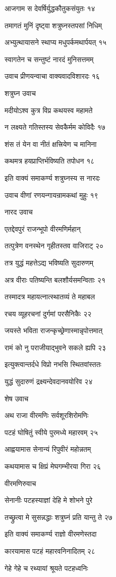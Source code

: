 आजगाम स देवर्षिर्युद्धकौतुकसंयुतः १४

तमागतं मुनिं दृष्ट्वा शत्रुघ्नस्तपसां निधिम्

अभ्युत्थायासने स्थाप्य मधुपर्कमथार्पयत् १५

स्वागतेन च सन्तुष्टं नारदं मुनिसत्तमम्

उवाच प्रीणयन्वाचा वाक्यवादविशारदः १६

शत्रुघ्न उवाच

मदीयोऽश्व कुत्र विप्र कथयस्व महामते

न लक्ष्यते गतिस्तस्य सेवकैर्मम कोविदैः १७

शंस तं येन वा नीतं क्षत्त्रियेण च मानिना

कथमत्र हयप्राप्तिर्भविष्यति तपोधन १८

इति वाक्यं समाकर्ण्य शत्रुघ्नस्य स नारदः

उवाच वीणां रणयन्गायन्रामकथां मुहुः १९

नारद उवाच

एतद्देवपुरं राजन्भूपो वीरमणिर्महान्

तत्पुत्रेण वनस्थेन गृहीतस्तव वाजिराट् २०

तत्र युद्धं महत्तेऽद्य भविष्यति सुदारुणम्

अत्र वीराः पतिष्यन्ति बलशौर्यसमन्विताः २१

तस्मादत्र महायत्नात्स्थातव्यं ते महाबल

रचय व्यूहरचनां दुर्गमां परसैनिकैः २२

जयस्ते भविता राजन्कृच्छ्रेणास्मान्नृपोत्तमात्

रामं को नु पराजीयाद्भुवने सकले ह्यपि २३

इत्युक्त्वान्तर्दधे विप्रो नभसि स्थितवांस्ततः

युद्धं सुदारुणं द्रक्ष्यन्देवदानवयोरिव २४

शेष उवाच

अथ राजा वीरमणिः सर्वशूरशिरोमणिः

पटहं घोषितुं स्वीये पुरमध्ये महारवम् २५

आह्वयामास सेनान्यं रिपुवीरं महोन्नतम्

कथयामास च क्षिप्रं मेघगम्भीरया गिरा २६

वीरमणिरुवाच

सेनानीः पटहस्याज्ञां देहि मे शोभने पुरे

तच्छ्रुत्वा मे सुसन्नद्धाः शत्रुघ्नं प्रति यान्तु ते २७

इति वाक्यं समाकर्ण्य राज्ञो वीरमणेस्तदा

कारयामास पटहं महारवनिनादितम् २८

गेहे गेहे च रथ्यायां श्रूयते पटहध्वनिः

